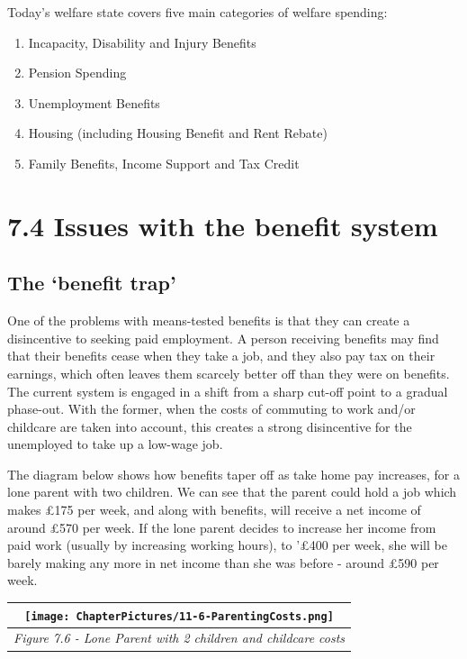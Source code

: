\documentclass[]{tufte-handout}
\providecommand{\tightlist}{%
  \setlength{\itemsep}{0pt}\setlength{\parskip}{0pt}}
\begin{document}
Today's welfare state covers five main categories of welfare spending:

\begin{enumerate}
\def\labelenumi{\arabic{enumi}.}
\tightlist
\item
  Incapacity, Disability and Injury Benefits
\item
  Pension Spending
\item
  Unemployment Benefits
\item
  Housing (including Housing Benefit and Rent Rebate)
\item
  Family Benefits, Income Support and Tax Credit
\end{enumerate}

\hypertarget{issues-with-the-benefit-system}{%
\section{7.4 Issues with the benefit
system}\label{issues-with-the-benefit-system}}

\hypertarget{the-benefit-trap}{%
\subsection{The `benefit trap'}\label{the-benefit-trap}}

One of the problems with means-tested benefits is that they can create a
disincentive to seeking paid employment. A person receiving benefits may
find that their benefits cease when they take a job, and they also pay
tax on their earnings, which often leaves them scarcely better off than
they were on benefits. The current system is engaged in a shift from a
sharp cut-off point to a gradual phase-out. With the former, when the
costs of commuting to work and/or childcare are taken into account, this
creates a strong disincentive for the unemployed to take up a low-wage
job.

The diagram below shows how benefits taper off as take home pay
increases, for a lone parent with two children. We can see that the
parent could hold a job which makes £175 per week, and along with
benefits, will receive a net income of around £570 per week. If the lone
parent decides to increase her income from paid work (usually by
increasing working hours), to '£400 per week, she will be barely making
any more in net income than she was before - around £590 per week.

\begin{longtable}[]{@{}c@{}}
\toprule
\texttt{[image: ChapterPictures/11-6-ParentingCosts.png]}\tabularnewline
\midrule
\endhead
\emph{Figure 7.6 - Lone Parent with 2 children and childcare
costs}\tabularnewline
\bottomrule
\end{longtable}
\end{document}
